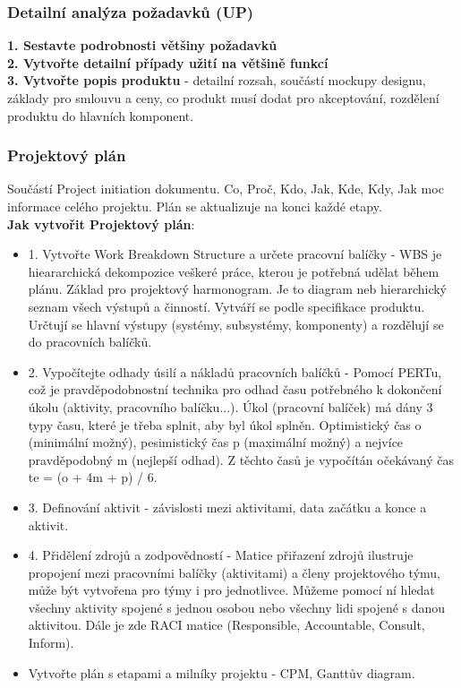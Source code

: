 \documentclass[11pt,a4paper]{article}
\begin{document}
    \subsubsection{Detailní analýza požadavků (UP)}
        \textbf{1. Sestavte podrobnosti většiny požadavků}\\
        \textbf{2. Vytvořte detailní případy užití na většině funkcí}\\
        \textbf{3. Vytvořte popis produktu} - detailní rozsah, součástí mockupy designu, základy pro smlouvu a ceny, co produkt musí dodat pro akceptování, rozdělení produktu do hlavních komponent.
    \subsubsection{Projektový plán}
        Součástí Project initiation dokumentu. Co, Proč, Kdo, Jak, Kde, Kdy, Jak moc informace celého projektu. Plán se aktualizuje na konci každé etapy.\\
        \textbf{Jak vytvořit Projektový plán}:
        \begin{itemize}
            \item 1. Vytvořte Work Breakdown Structure a určete pracovní balíčky - WBS je hieararchická dekompozice veškeré práce, kterou je potřebná udělat během plánu. Základ pro projektový harmonogram. Je to diagram neb hierarchický seznam všech výstupů a činností. Vytváří se podle specifikace produktu. Určtují se hlavní výstupy (systémy, subsystémy, komponenty) a rozdělují se do pracovních balíčků.
            \item 2. Vypočítejte odhady úsilí a nákladů pracovních balíčků - Pomocí PERTu, což je pravděpodobnostní technika pro odhad času potřebného k dokončení úkolu (aktivity, pracovního balíčku...). Úkol (pracovní balíček) má dány 3 typy času, které je třeba splnit, aby byl úkol splněn. Optimistický čas o (minimální možný), pesimistický čas p (maximální možný) a nejvíce pravděpodobný m (nejlepší odhad). Z těchto časů je vypočítán očekávaný čas te = (o + 4m + p) / 6.
            \item 3. Definování aktivit - závislosti mezi aktivitami, data začátku a konce a aktivit.
            \item 4. Přidělení zdrojů a zodpovědností - Matice přiřazení zdrojů ilustruje propojení mezi pracovními balíčky (aktivitami) a členy projektového týmu, může být vytvořena pro týmy i pro jednotlivce. Můžeme pomocí ní hledat všechny aktivity spojené s jednou osobou nebo všechny lidi spojené s danou aktivitou. Dále je zde RACI matice (Responsible, Accountable, Consult, Inform).
            \item Vytvořte plán s etapami a milníky projektu - CPM, Ganttův diagram.
        \end{itemize}
\end{document}

